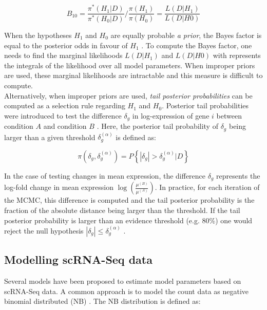\begin{equation}
B_{10}=\frac{\pi^*(H_1|D)}{\pi^*(H_0|D)}/{}\frac{\pi(H_1)}{\pi(H_0)}=\frac{L(D|H_1)}{L(D|H0)}
\end{equation}  

When the hypotheses $H_1$ and $H_0$ are equally probable \emph{a prior}, the Bayes factor is equal to the posterior odds in favour of $H_1$ \citep{Kass1995}. To compute the Bayes factor, one needs to find the marginal likelihoods $L(D|H_1)$ and $L(D|H0)$ with represents the integrals of the likelihood over all model parameters. When improper priors are used, these marginal likelihoods are intractable and this measure is difficult to compute. \\

Alternatively, when improper priors are used, \emph{tail posterior probabilities} can be computed as a selection rule regarding $H_1$ and $H_0$. Posterior tail probabilities were introduced to test the difference $\delta_g$ in log-expression of gene $i$ between condition $A$ and condition $B$ \citep{Bochkina2007}. Here, the posterior tail probability of $\delta_g$ being larger than a given threshold $\delta_g^{(\alpha)}$ is defined as:

\begin{equation}
\pi(\delta_g,\delta_g^{(\alpha)})=P\left\lbrace|\delta_g|>\delta_g^{(\alpha)}|D\right\rbrace
\end{equation}

In the case of testing changes in mean expression, the difference $\delta_g$ represents the log-fold change in mean expression $\log(\frac{\mu^{(B)}}{\mu^{(A)}})$. In practice, for each iteration of the MCMC, this difference is computed and the tail posterior probability is the fraction of the absolute distance being larger than the threshold. If the tail posterior probability is larger than an evidence threshold (e.g. 80\%) one would reject the null hypothesis $|\delta_g|\leq\delta_g^{(\alpha)}$ \citep{Vallejos2016}. 

\subsection{Modelling scRNA-Seq data}

Several models have been proposed to estimate model parameters based on scRNA-Seq data. A common approach is to model the count data as negative binomial distributed (NB) \citep{Vallejos2015BASiCS, Risso2018, Lopez2018}. The NB distribution is defined as:

